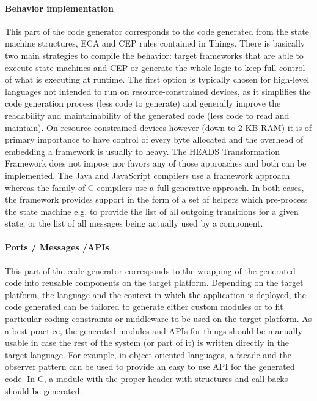 \paragraph{Behavior implementation}
This part of the code generator corresponds to the code generated from the state machine structures, ECA and CEP rules contained in Things. There is basically two main strategies to compile the behavior: target frameworks that are able to execute state machines and CEP or generate the whole logic to keep full control of what is executing at runtime. The first option is typically chosen for high-level languages not intended to run on resource-constrained devices, as it simplifies the code generation process (less code to generate) and generally improve the readability and maintainability of the generated code (less code to read and maintain). On resource-constrained devices however (down to 2 KB RAM) it is of primary importance to have control of every byte allocated and the overhead of embedding a framework is usually to heavy. The HEADS Transformation Framework does not impose nor favors any of those approaches and both can be implemented. The Java and JavaScript compilers use a framework approach whereas the family of C compilers use a full generative approach. In both cases, the framework provides support in the form of a set of helpers which pre-process the state machine e.g. to provide the list of all outgoing transitions for a given state, or the list of all messages being actually used by a component. 

\paragraph{Ports / Messages /APIs}

This part of the code generator corresponds to the wrapping of the generated code into reusable components on the target platform. Depending on the target platform, the language and the context in which the application is deployed, the code generated can be tailored to generate either custom modules or to fit particular coding constraints or middleware to be used on the target platform. As a best practice, the generated modules and APIs for things should be manually usable in case the rest of the system (or part of it) is written directly in the target language. For example, in object oriented languages, a facade and the observer pattern can be used to provide an easy to use API for the generated code. In C, a module with the proper header with structures and call-backs should be generated. 


